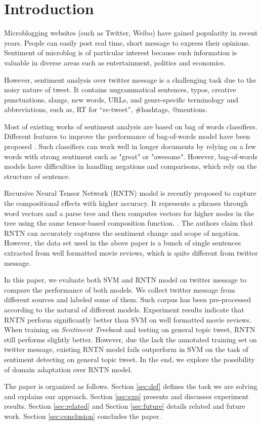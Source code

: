 \section{Introduction}

Microblogging websites (such as Twitter, Weibo) have gained popularity in recent years. People can easily post real time, short message to express their opinions. 
Sentiment of microblog is of particular interest because such information is valuable in diverse areas such as entertainment, politics and economics.

However, sentiment analysis over twitter message is a challenging task due to the noisy nature of tweet. 
It contains ungrammatical sentences, typos, creative punctuations, slangs, new words, URLs, and genre-specific terminology and abbreviations, such as, RT for “re-tweet”, \#hashtags, @mentions. 

Most of existing works of sentiment analysis are based on bag of words classifiers. Different features to improve the performance of bag-of-words model have been proposed \cite{Agarwal:2011}. Such classifiers can work well in longer documents by relying on a few words with strong sentiment such as "great" or "awesome". However, bag-of-words models have difficulties in handling negations and comparisons, which rely on the structure of sentence. 

Recursive Neural Tensor Network (RNTN) model is recently proposed to capture the compositional effects with higher accuracy. It represents a phrases through word vectors and a parse tree and then computes vectors for higher nodes in the tree using the same tensor-based composition function. \cite{Socher:2013}. The authors claim that RNTN can accurately captures the sentiment change and scope of negation. However, the data set used in the above paper is a bunch of single sentences extracted from well formatted movie reviews, which is quite different from twitter message. 

In this paper, we evaluate both SVM and RNTN model on twitter message to compare the performance of both models. We collect twitter message from different sources and labeled some of them. Such corpus has been pre-processed according to the natural of different models. Experiment results indicate that RNTN perform significantly better than SVM on well formatted movie reviews. When training on \textit{Sentiment Treebank} and testing on general topic tweet, RNTN still performs slightly better. However, due the lack the annotated training set on twitter message, existing RNTN model fails outperform in SVM on the task of sentiment detecting on general topic tweet. In the end, we explore the possibility of domain adaptation over RNTN model.  


The paper is organized as follows. Section \ref{sec:def} defines the task we are solving and explains our approach. 
Section \ref{sec:exp} presents and discusses experiment results. Section \ref{sec:related} and Section \ref{sec:future} details related and future work. Section \ref{sec:conclusion} concludes the paper.

